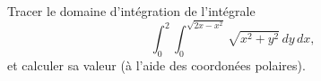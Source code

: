 \begin{exercice}\label{exocontrolecontinu0004}
  
Tracer le domaine d'intégration de l'intégrale
\[
\int_0^2\int_0^{\sqrt{2x-x^2}} \sqrt{x^2+y^2}\, dy\,dx,
\]
et calculer sa valeur (à l'aide des coordonées polaires). 
\end{exercice}
